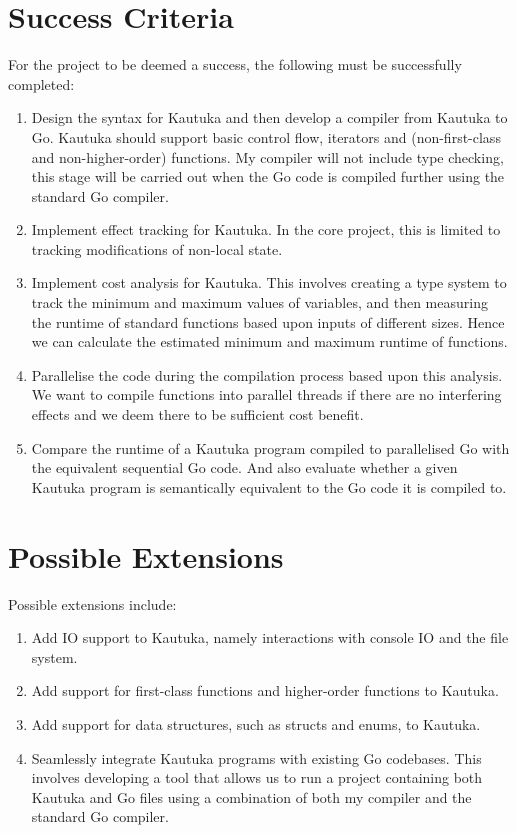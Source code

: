 \begin{refsection}
  \section{Success Criteria}

  For the project to be deemed a success, the following must be successfully completed:

  \begin{enumerate}
    \item Design the syntax for Kautuka and then develop a compiler from Kautuka to Go. Kautuka should support basic control flow, iterators and (non-first-class and non-higher-order) functions. My compiler will not include type checking, this stage will be carried out when the Go code is compiled further using the standard Go compiler.
    \item Implement effect tracking for Kautuka. In the core project, this is limited to tracking modifications of non-local state. 
    \item Implement cost analysis for Kautuka. This involves creating a type system to track the minimum and maximum values of variables, and then measuring the runtime of standard functions based upon inputs of different sizes. Hence we can calculate the estimated minimum and maximum runtime of functions. 
    \item Parallelise the code during the compilation process based upon this analysis. We want to compile functions into parallel threads if there are no interfering effects and we deem there to be sufficient cost benefit.
    \item Compare the runtime of a Kautuka program compiled to parallelised Go with the equivalent sequential Go code. And also evaluate whether a given Kautuka program is semantically equivalent to the Go code it is compiled to. 
  \end{enumerate}

  \section{Possible Extensions}

  Possible extensions include: 

  \begin{enumerate}
    \item Add IO support to Kautuka, namely interactions with console IO and the file system.
    \item Add support for first-class functions and higher-order functions to Kautuka.
    \item Add support for data structures, such as structs and enums, to Kautuka.
    \item Seamlessly integrate Kautuka programs with existing Go codebases. This involves developing a tool that allows us to run a project containing both Kautuka and Go files using a combination of both my compiler and the standard Go compiler.
  \end{enumerate}


\end{refsection}
